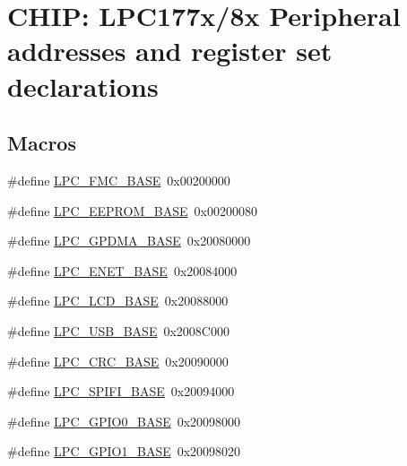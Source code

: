 \hypertarget{group__PERIPH__177X__8X__BASE}{\section{C\-H\-I\-P\-: L\-P\-C177x/8x Peripheral addresses and register set declarations}
\label{group__PERIPH__177X__8X__BASE}
}
\subsection*{Macros}
\begin{DoxyCompactItemize}
\item 
\#define \hyperlink{group__PERIPH__177X__8X__BASE_gaad6b7f57ab13bf5886da624bbb4bcc61}{L\-P\-C\-\_\-\-F\-M\-C\-\_\-\-B\-A\-S\-E}~0x00200000
\item 
\#define \hyperlink{group__PERIPH__177X__8X__BASE_ga9d1fcaafb9feb0f8253c3cef1edc7e9f}{L\-P\-C\-\_\-\-E\-E\-P\-R\-O\-M\-\_\-\-B\-A\-S\-E}~0x00200080
\item 
\#define \hyperlink{group__PERIPH__177X__8X__BASE_ga51ba8e3f33730fa2b78be3f892d8c278}{L\-P\-C\-\_\-\-G\-P\-D\-M\-A\-\_\-\-B\-A\-S\-E}~0x20080000
\item 
\#define \hyperlink{group__PERIPH__177X__8X__BASE_ga73c18d53000abe3814c4b787cd83a57c}{L\-P\-C\-\_\-\-E\-N\-E\-T\-\_\-\-B\-A\-S\-E}~0x20084000
\item 
\#define \hyperlink{group__PERIPH__177X__8X__BASE_gae1746cd618a1eb4f24f95255594f159a}{L\-P\-C\-\_\-\-L\-C\-D\-\_\-\-B\-A\-S\-E}~0x20088000
\item 
\#define \hyperlink{group__PERIPH__177X__8X__BASE_gaa619008881e9f76dc31131313eff1b79}{L\-P\-C\-\_\-\-U\-S\-B\-\_\-\-B\-A\-S\-E}~0x2008\-C000
\item 
\#define \hyperlink{group__PERIPH__177X__8X__BASE_ga6d27804148d49c67065a8cd351ebc7b7}{L\-P\-C\-\_\-\-C\-R\-C\-\_\-\-B\-A\-S\-E}~0x20090000
\item 
\#define \hyperlink{group__PERIPH__177X__8X__BASE_gad284a5971366e0a8b5fe9881fdb9aa0c}{L\-P\-C\-\_\-\-S\-P\-I\-F\-I\-\_\-\-B\-A\-S\-E}~0x20094000
\item 
\#define \hyperlink{group__PERIPH__177X__8X__BASE_ga09e0e964ea1abf3b991772df2aa52405}{L\-P\-C\-\_\-\-G\-P\-I\-O0\-\_\-\-B\-A\-S\-E}~0x20098000
\item 
\#define \hyperlink{group__PERIPH__177X__8X__BASE_ga9fb0536853721a3073bd69d94d0b7ec2}{L\-P\-C\-\_\-\-G\-P\-I\-O1\-\_\-\-B\-A\-S\-E}~0x20098020

\end{DoxyCompactItemize}
